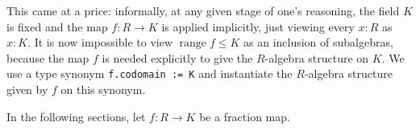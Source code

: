 \documentclass[a4paper,USenglish,cleveref, autoref, thm-restate]{lipics-v2021}
\newcommand{\lean}[1]{\texttt{#1}\xspace} %
\newcommand{\Q}{\mathbb{Q}}
\newcommand{\Z}{\mathbb{Z}}
\DeclareMathOperator{\Frac}{Frac}
\begin{document}

This came at a price: %
informally, at any given stage of one's reasoning, the field $K$ is fixed and the map $f\colon R\to K$ is applied implicitly, just viewing every $x:R$ as $x:K$.
It is now impossible to view $\mathop{range} f \leq K$ as an inclusion of subalgebras,
because the map $f$ is needed explicitly to give the $R$-algebra structure on $K$.
We use a type synonym \lean{f.codomain := K} and instantiate the $R$-algebra structure given by $f$ on this synonym.

In the following sections, let $f : R \to K$ be a fraction map.
\end{document}
